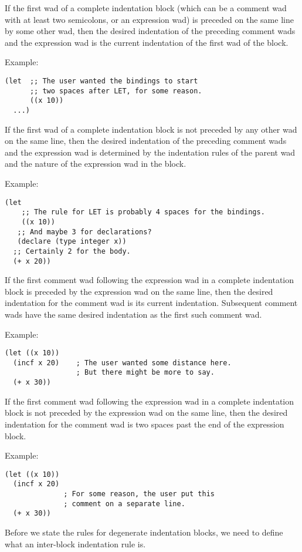 If the first wad of a complete indentation block (which can be a
comment wad with at least two semicolons, or an expression wad) is
preceded on the same line by some other wad, then the desired
indentation of the preceding comment wads and the expression wad is
the current indentation of the first wad of the block.

Example:
\begin{verbatim}
(let  ;; The user wanted the bindings to start
      ;; two spaces after LET, for some reason.
      ((x 10))
  ...)
\end{verbatim}

If the first wad of a complete indentation block is not preceded by
any other wad on the same line, then the desired indentation of the
preceding comment wads and the expression wad is determined by the
indentation rules of the parent wad and the nature of the expression
wad in the block.

Example:
\begin{verbatim}
(let  
    ;; The rule for LET is probably 4 spaces for the bindings.
    ((x 10))
   ;; And maybe 3 for declarations?
   (declare (type integer x))
  ;; Certainly 2 for the body.
  (+ x 20))
\end{verbatim}

If the first comment wad following the expression wad in a complete
indentation block is preceded by the expression wad on the same line,
then the desired indentation for the comment wad is its current
indentation.  Subsequent comment wads have the same desired
indentation as the first such comment wad.

Example:

\begin{verbatim}
(let ((x 10))
  (incf x 20)    ; The user wanted some distance here.
                 ; But there might be more to say.
  (+ x 30))
\end{verbatim}

If the first comment wad following the expression wad in a complete
indentation block is not preceded by the expression wad on the same
line, then the desired indentation for the comment wad is two spaces
past the end of the expression block.

Example:
\begin{verbatim}
(let ((x 10))
  (incf x 20)    
              ; For some reason, the user put this
              ; comment on a separate line.
  (+ x 30))
\end{verbatim}

Before we state the rules for degenerate indentation blocks, we need
to define what an inter-block indentation rule is.

